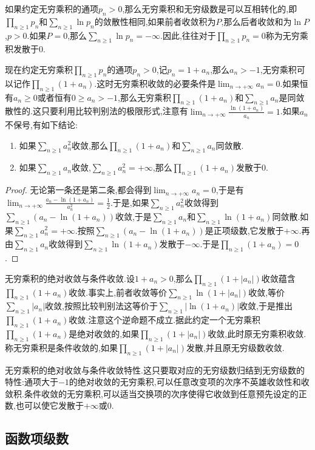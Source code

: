 如果约定无穷乘积的通项$p_n>0$,那么无穷乘积和无穷级数是可以互相转化的,即$\prod_{n\ge1}p_n$和$\sum_{n\ge1}\ln p_n$的敛散性相同,如果前者收敛积为$P$,那么后者收敛和为$\ln P$,$p>0$.如果$P=0$,那么$\sum_{n\ge1}\ln p_n=-\infty$.因此,往往对于$\prod_{n\ge1}p_n=0$称为无穷乘积发散于0.

现在约定无穷乘积$\prod_{n\ge1}p_n$的通项$p_n>0$,记$p_n=1+a_n$,那么$a_n>-1$,无穷乘积可以记作$\prod_{n\ge1}(1+a_n)$.这时无穷乘积收敛的必要条件是$\lim_{n\to+\infty}a_n=0$.如果恒有$a_n\ge0$或者恒有$0\ge a_n>-1$,那么无穷乘积$\prod_{n\ge1}(1+a_n)$和$\sum_{n\ge1}a_n$是同敛散性的.这只要利用比较判别法的极限形式,注意有$\lim_{n\to+\infty}\frac{\ln(1+a_n)}{a_n}=1$.如果$a_n$不保号,有如下结论:
\begin{enumerate}
	\item 如果$\sum_{n\ge1}a_n^2$收敛,那么$\prod_{n\ge1}(1+a_n)$和$\sum_{n\ge1}a_n$同敛散.
	\item 如果$\sum_{n\ge1}a_n$收敛,$\sum_{n\ge1}a_n^2=+\infty$,那么$\prod_{n\ge1}(1+a_n)$发散于0.
\end{enumerate}
\begin{proof}
	
	无论第一条还是第二条,都会得到$\lim_{n\to+\infty}a_n=0$,于是有$\lim_{n\to+\infty}\frac{a_n-\ln(1+a_n)}{a_n^2}=\frac{1}{2}$.于是,如果$\sum_{n\ge1}a_n^2$收敛得到$\sum_{n\ge1}\left(a_n-\ln(1+a_n)\right)$收敛,于是$\sum_{n\ge1}a_n$和$\sum_{n\ge1}\ln(1+a_n)$同敛散.如果$\sum_{n\ge1}a_n^2=+\infty$.按照$\sum_{n\ge1}\left(a_n-\ln(1+a_n)\right)$是正项级数,它发散于$+\infty$.再由$\sum_{n\ge1}a_n$收敛得到$\sum_{n\ge1}\ln(1+a_n)$发散于$-\infty$.于是$\prod_{n\ge1}(1+a_n)=0$.
	
\end{proof}

无穷乘积的绝对收敛与条件收敛.设$1+a_n>0$,那么$\prod_{n\ge1}(1+|a_n|)$收敛蕴含$\prod_{n\ge1}(1+a_n)$收敛.事实上,前者收敛等价$\sum_{n\ge1}\ln(1+|a_n|)$收敛,等价$\sum_{n\ge1}|a_n|$收敛,按照比较判别法这等价于$\sum_{n\ge1}|\ln(1+a_n)|$收敛,于是推出$\prod_{n\ge1}(1+a_n)$收敛.注意这个逆命题不成立.据此约定一个无穷乘积$\prod_{n\ge1}(1+a_n)$是绝对收敛的,如果$\prod_{n\ge1}(1+|a_n|)$收敛,此时原无穷乘积收敛.称无穷乘积是条件收敛的,如果$\prod_{n\ge1}(1+|a_n|)$发散,并且原无穷级数收敛.

无穷乘积的绝对收敛与条件收敛特性.这只要取对应的无穷级数归结到无穷级数的特性:通项大于$-1$的绝对收敛的无穷乘积,可以任意改变项的次序不英雄收敛性和收敛积.条件收敛的无穷乘积,可以适当交换项的次序使得它收敛到任意预先设定的正数,也可以使它发散于$+\infty$或0.
\newpage
\subsection{函数项级数}

